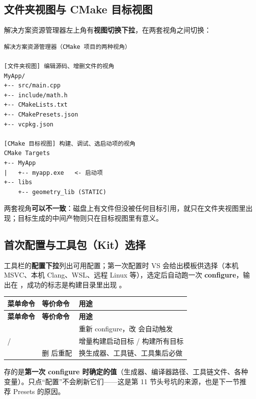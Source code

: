 \subsection{文件夹视图与 CMake 目标视图}
解决方案资源管理器左上角有\textbf{视图切换下拉}，在两套视角之间切换：

\begin{lstlisting}[style=textstyle]
解决方案资源管理器（CMake 项目的两种视角）

[文件夹视图] 编辑源码、增删文件的视角
MyApp/
+-- src/main.cpp
+-- include/math.h
+-- CMakeLists.txt
+-- CMakePresets.json
+-- vcpkg.json

[CMake 目标视图] 构建、调试、选启动项的视角
CMake Targets
+-- MyApp
|   +-- myapp.exe   <- 启动项
+-- libs
    +-- geometry_lib (STATIC)
\end{lstlisting}

两套视角\textbf{可以不一致}：磁盘上有文件但没被任何目标引用，就只在文件夹视图里出现；目标生成的中间产物则只在目标视图里有意义。

\subsection{首次配置与工具包（Kit）选择}
工具栏的\textbf{配置下拉}列出可用配置；第一次配置时 VS 会给出模板供选择（本机 MSVC、本机 Clang、WSL、远程 Linux 等），选定后自动跑一次 \textbf{configure}，输出在 ，成功的标志是构建目录里出现 。

\begin{longtable}{L{3.6cm}L{4.4cm}L{6.6cm}}
\toprule \textbf{菜单命令} & \textbf{等价命令} & \textbf{用途} \\ \midrule
\endfirsthead
\toprule \textbf{菜单命令} & \textbf{等价命令} & \textbf{用途} \\ \midrule
\endhead
\bottomrule \endlastfoot
{} &  & 重新 configure，改  会自动触发 \\
 /  &  & 增量构建启动目标 / 构建所有目标 \\
 & 删  后重配 & 换生成器、工具链、工具集后必做 \\
\end{longtable}
\begin{warnbox}[注意]
 存的是\textbf{第一次 configure 时确定的值}（生成器、编译器路径、工具链文件、各种  变量）。只点“配置”不会刷新它们——这是第 11 节头号坑的来源，也是下一节推荐 Presets 的原因。
\end{warnbox}

